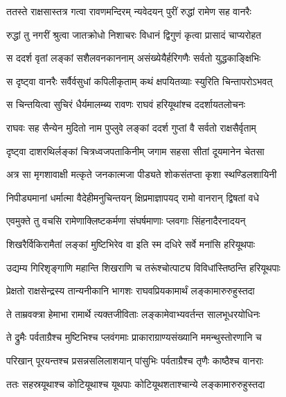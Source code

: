 
\twolineshloka
{ततस्ते राक्षसास्तत्र गत्वा रावणमन्दिरम्}
{न्यवेदयन् पुरीं रुद्धां रामेण सह वानरैः} %

\twolineshloka
{रुद्धां तु नगरीं श्रुत्वा जातक्रोधो निशाचरः}
{विधानं द्विगुणं कृत्वा प्रासादं चाप्यरोहत} %

\twolineshloka
{स ददर्श वृतां लङ्कां सशैलवनकाननाम्}
{असंख्येयैर्हरिगणैः सर्वतो युद्धकाङ्क्षिभिः} %

\twolineshloka
{स दृष्ट्वा वानरैः सर्वैर्वसुधां कपिलीकृताम्}
{कथं क्षपयितव्याः स्युरिति चिन्तापरोऽभवत्} %

\twolineshloka
{स चिन्तयित्वा सुचिरं धैर्यमालम्ब्य रावणः}
{राघवं हरियूथांश्च ददर्शायतलोचनः} %

\twolineshloka
{राघवः सह सैन्येन मुदितो नाम पुप्लुवे}
{लङ्कां ददर्श गुप्तां वै सर्वतो राक्षसैर्वृताम्} %

\twolineshloka
{दृष्ट्वा दाशरथिर्लङ्कां चित्रध्वजपताकिनीम्}
{जगाम सहसा सीतां दूयमानेन चेतसा} %

\twolineshloka
{अत्र सा मृगशावाक्षी मत्कृते जनकात्मजा}
{पीड्यते शोकसंतप्ता कृशा स्थण्डिलशायिनी} %

\twolineshloka
{निपीड्यमानां धर्मात्मा वैदेहीमनुचिन्तयन्}
{क्षिप्रमाज्ञापयद् रामो वानरान् द्विषतां वधे} %

\twolineshloka
{एवमुक्ते तु वचसि रामेणाक्लिष्टकर्मणा}
{संघर्षमाणाः प्लवगाः सिंहनादैरनादयन्} %

\twolineshloka
{शिखरैर्विकिरामैतां लङ्कां मुष्टिभिरेव वा}
{इति स्म दधिरे सर्वे मनांसि हरियूथपाः} %

\twolineshloka
{उद्यम्य गिरिशृङ्गाणि महान्ति शिखराणि च}
{तरूंश्चोत्पाट्य विविधांस्तिष्ठन्ति हरियूथपाः} %

\twolineshloka
{प्रेक्षतो राक्षसेन्द्रस्य तान्यनीकानि भागशः}
{राघवप्रियकामार्थं लङ्कामारुरुहुस्तदा} %

\twolineshloka
{ते ताम्रवक्त्रा हेमाभा रामार्थे त्यक्तजीविताः}
{लङ्कामेवाभ्यवर्तन्त सालभूधरयोधिनः} %

\twolineshloka
{ते द्रुमैः पर्वताग्रैश्च मुष्टिभिश्च प्लवंगमाः}
{प्राकाराग्राण्यसंख्यानि ममन्थुस्तोरणानि च} %

\twolineshloka
{परिखान् पूरयन्तश्च प्रसन्नसलिलाशयान्}
{पांसुभिः पर्वताग्रैश्च तृणैः काष्ठैश्च वानराः} %

\twolineshloka
{ततः सहस्रयूथाश्च कोटियूथाश्च यूथपाः}
{कोटियूथशताश्चान्ये लङ्कामारुरुहुस्तदा} %

